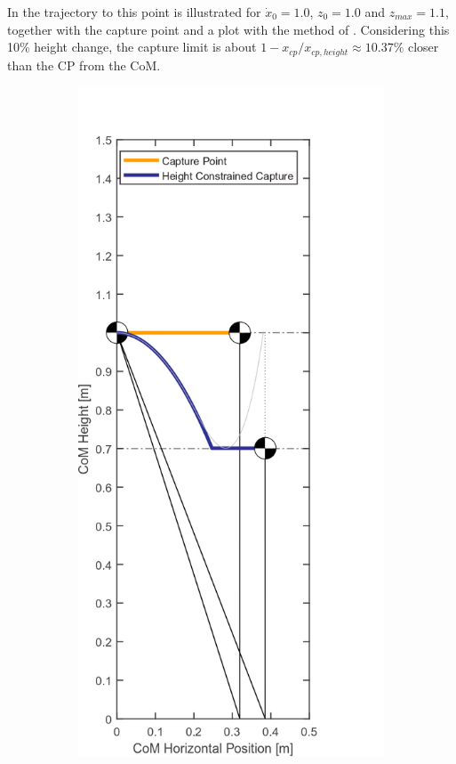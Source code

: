 In  the trajectory to this point is illustrated for  $\dot{x}_0=1.0$, $z_0=1.0$ and $z_{max}=1.1$, together with the capture point and a plot with the method of \cite{koolen2016balance}. Considering this 10\% height change, the capture limit is about $1-x_{cp}/x_{cp,height}\approx 10.37 \%$ closer than the \ac{CP} from the \ac{CoM}.
\begin{figure}[h]
\centering
  \begin{subfigure}{0.45\textwidth}
    \centering
  \includegraphics[width=.8\linewidth]{STYLESTUFF/CPvsMinHeight.png}

\end{subfigure}
\end{figure}

